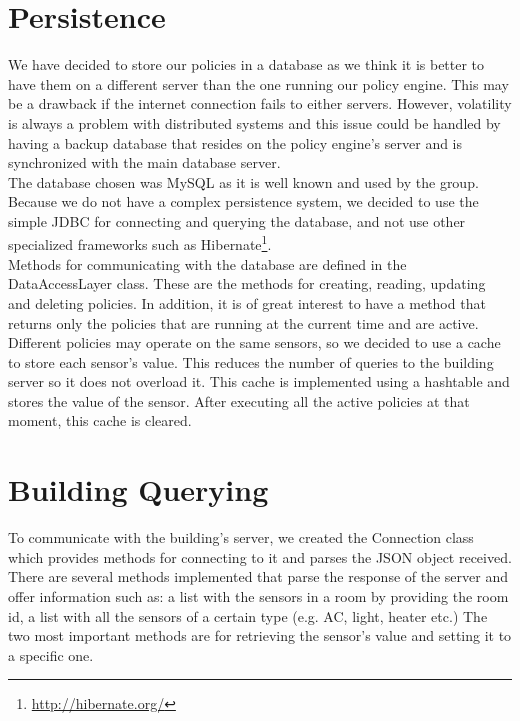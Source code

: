 \section{Persistence}
We have decided to store our policies in a database as we think it is better to have them on a different server than the one running our policy engine. This may be a drawback if the internet connection fails to either servers. However, volatility is always a problem with distributed systems and this issue could be handled by having a backup database that resides on the policy engine's server and is synchronized with the main database server.
\\The database chosen was MySQL as it is well known and used by the group. Because we do not have a complex persistence system, we decided to use the simple JDBC for connecting and querying the database, and not use other specialized frameworks such as Hibernate\footnote{\url{http://hibernate.org/}}. 
\\Methods for communicating with the database are defined in the DataAccessLayer class. These are the methods for creating, reading, updating and deleting policies. In addition, it is of great interest to have a method that returns only the policies that are running at the current time and are active. 
\\Different policies may operate on the same sensors, so we decided to use a cache to store each sensor's value. This reduces the number of queries to the building server so it does not overload it. This cache is implemented using a hashtable and stores the value of the sensor. After executing all the active policies at that moment, this cache is cleared. 

\section{Building Querying}
To communicate with the building's server, we created the Connection class which provides methods for connecting to it and parses the JSON object received. There are several methods implemented that parse the response of the server and offer information such as: a list with the sensors in a room by providing the room id, a list with all the sensors of a certain type (e.g. AC, light, heater etc.) The two most important methods are for retrieving the sensor's value and setting it to a specific one. 


